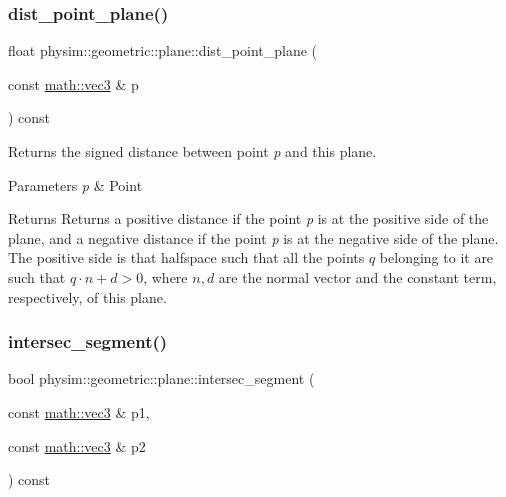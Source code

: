\subsubsection{\texorpdfstring{dist\+\_\+point\+\_\+plane()}{dist\_point\_plane()}}
{\footnotesize\ttfamily float physim\+::geometric\+::plane\+::dist\+\_\+point\+\_\+plane (\begin{DoxyParamCaption}\item[{const \hyperlink{structphysim_1_1math_1_1vec3}{math\+::vec3} \&}]{p }\end{DoxyParamCaption}) const}



Returns the signed distance between point {\itshape p} and this plane. 


\begin{DoxyParams}{Parameters}
{\em p} & Point \\
\hline
\end{DoxyParams}
\begin{DoxyReturn}{Returns}
Returns a positive distance if the point {\itshape p} is at the \textquotesingle{}positive\textquotesingle{} side of the plane, and a negative distance if the point {\itshape p} is at the \textquotesingle{}negative\textquotesingle{} side of the plane.~\newline
The positive side is that halfspace such that all the points $q$ belonging to it are such that $ q\cdot n + d > 0$, where $n,d$ are the normal vector and the constant term, respectively, of this plane. 
\end{DoxyReturn}
\mbox{\label{classphysim_1_1geometric_1_1plane_a8a3b99b36271702bbececed5fce16391}} 
\subsubsection{\texorpdfstring{intersec\+\_\+segment()}{intersec\_segment()}\hspace{0.1cm}{\footnotesize\ttfamily [1/2]}}
{\footnotesize\ttfamily bool physim\+::geometric\+::plane\+::intersec\+\_\+segment (\begin{DoxyParamCaption}\item[{const \hyperlink{structphysim_1_1math_1_1vec3}{math\+::vec3} \&}]{p1,  }\item[{const \hyperlink{structphysim_1_1math_1_1vec3}{math\+::vec3} \&}]{p2 }\end{DoxyParamCaption}) const\hspace{0.3cm}{\ttfamily [virtual]}}



